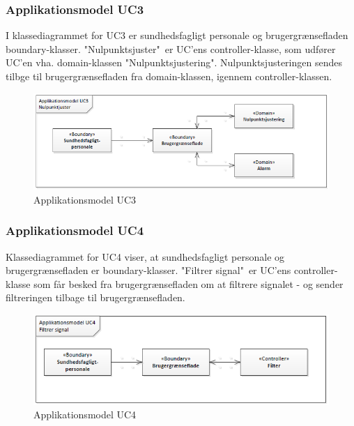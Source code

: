 \subsubsection{Applikationsmodel UC3}
I klassediagrammet for UC3 er sundhedsfagligt personale og brugergrænsefladen boundary-klasser. "Nulpunktsjuster"\ er UC'ens controller-klasse, som udfører UC'en vha. domain-klassen "Nulpunktsjustering". Nulpunktsjusteringen sendes tilbge til brugergrænsefladen fra domain-klassen, igennem controller-klassen.
\begin{figure}[H]
\centering
\includegraphics[scale=0.70]{app3.PNG}
\caption{Applikationsmodel UC3}
\end{figure}

\subsubsection{Applikationsmodel UC4}
Klassediagrammet for UC4 viser, at sundhedsfagligt personale og brugergrænsefladen er boundary-klasser. "Filtrer signal"\ er UC'ens controller-klasse som får besked fra brugergrænsefladen om at filtrere signalet - og sender filtreringen tilbage til brugergrænsefladen. 
\begin{figure}[H]
\centering
\includegraphics[scale=0.70]{app4.PNG}
\caption{Applikationsmodel UC4}
\end{figure}

